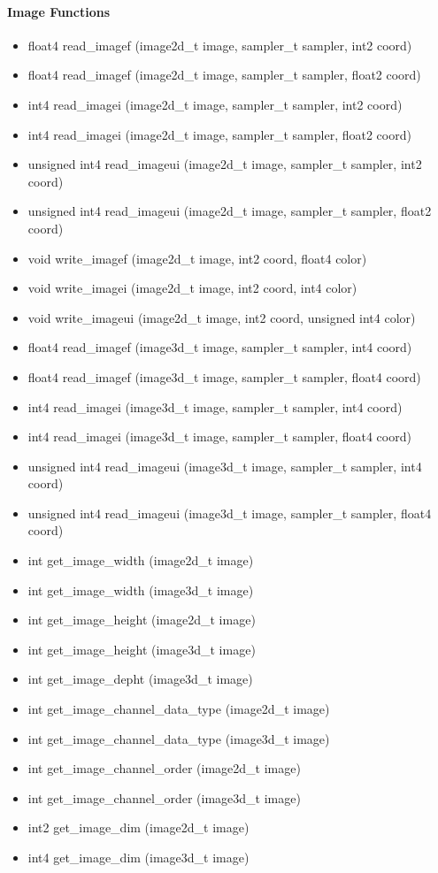 				\paragraph{Image Functions}
				
\begin{itemize}
	\item float4 read\_imagef (image2d\_t image, sampler\_t sampler, int2 coord)
	\item float4 read\_imagef (image2d\_t image, sampler\_t sampler, float2 coord)
	\item int4 read\_imagei (image2d\_t image, sampler\_t sampler, int2 coord)
	\item int4 read\_imagei (image2d\_t image, sampler\_t sampler, float2 coord)
	\item unsigned int4 read\_imageui (image2d\_t image, sampler\_t sampler, int2 coord)
	\item unsigned int4 read\_imageui (image2d\_t image, sampler\_t sampler, float2 coord)
	\item void write\_imagef (image2d\_t image, int2 coord, float4 color)
	\item void write\_imagei (image2d\_t image, int2 coord, int4 color)
	\item void write\_imageui (image2d\_t image, int2 coord, unsigned int4 color)
	\item float4 read\_imagef (image3d\_t image, sampler\_t sampler, int4 coord)
	\item float4 read\_imagef (image3d\_t image, sampler\_t sampler, float4 coord)
	\item int4 read\_imagei (image3d\_t image, sampler\_t sampler, int4 coord)
	\item int4 read\_imagei (image3d\_t image, sampler\_t sampler, float4 coord)
	\item unsigned int4 read\_imageui (image3d\_t image, sampler\_t sampler, int4 coord)
	\item unsigned int4 read\_imageui (image3d\_t image, sampler\_t sampler, float4 coord)
	\item int get\_image\_width (image2d\_t image)
	\item int get\_image\_width (image3d\_t image)
	\item int get\_image\_height (image2d\_t image)
	\item int get\_image\_height (image3d\_t image)
	\item int get\_image\_depht (image3d\_t image)
	\item int get\_image\_channel\_data\_type (image2d\_t image)
	\item int get\_image\_channel\_data\_type (image3d\_t image)
	\item int get\_image\_channel\_order (image2d\_t image)
	\item int get\_image\_channel\_order (image3d\_t image)
	\item int2 get\_image\_dim (image2d\_t image)
	\item int4 get\_image\_dim (image3d\_t image)
\end{itemize}
			
